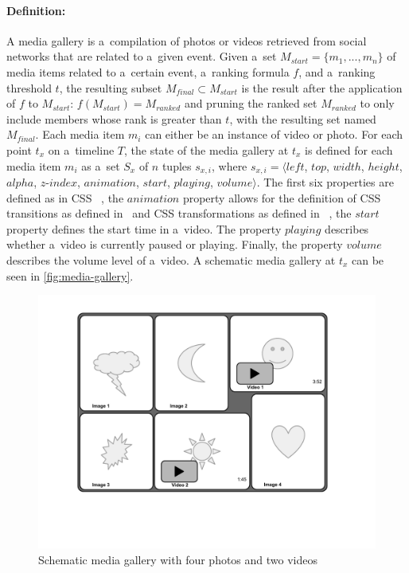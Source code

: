 \paragraph{Definition:}

A media gallery is a~compilation of photos or videos
retrieved from social networks that are related to a~given event.
Given a~set $M_{start} = \{m_1,..., m_n\}$ of media items related to a~certain event,
a~ranking formula $f$, and a~ranking threshold $t$,
the resulting subset $M_{final} \subset M_{start}$
is the result after the application of $f$ to $M_{start}$: $f(M_{start})=M_{ranked}$
and pruning the ranked set $M_{ranked}$ to only include members
whose rank is greater than $t$, with the resulting set named $M_{final}$.
Each media item $m_i$ can either be an instance of video or photo.
For each point $t_x$ on a~timeline $T$, the state of the media gallery
at $t_x$ is defined for each media item $m_i$
as a~set $S_x$ of $n$ tuples $s_{x,i}$, where
$s_{x,i}=\langle \mathit{left}$, $\mathit{top}$, $\mathit{width}$, $\mathit{height}$,
$\mathit{alpha}$, $\mathit{z\mbox{-}index}$, $\mathit{animation}$,
$\mathit{start}$, $\mathit{playing}$, $\mathit{volume} \rangle$.
The first six properties are defined as in CSS~%
\cite{bos2011css}, the $\mathit{animation}$ property
allows for the definition of CSS transitions as defined in~%
\cite{jackson2013csstransitions}
and CSS transformations as defined in~%
\cite{fraser2012csstransforms},
the $\mathit{start}$ property defines the start time in a~video.
The property $\mathit{playing}$ describes whether a~video is currently paused or playing.
Finally, the property $\mathit{volume}$ describes the volume level
of a~video.
A schematic media gallery at $t_x$ can be seen in \autoref{fig:media-gallery}.

\begin{figure}[!ht]
  \centering
  \includegraphics[trim=20mm 40mm 20mm 10mm, clip, width=0.7\columnwidth]{media-gallery.pdf}
  \caption{Schematic media gallery with four photos and two videos}
  \label{fig:media-gallery}
\end{figure}

